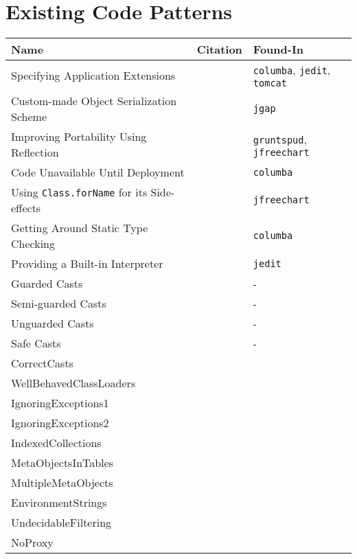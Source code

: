 \documentclass{usiinfdocprop}
\begin{document}
\chapter{Existing Code Patterns \label{orgf594f15}}
\label{sec:org352e005}
\begin{center}
\begin{tabular}{lll}
Name & Citation & Found-In\\
\hline
Specifying Application Extensions & \cite{livshits_improving_2006} & \texttt{columba}, \texttt{jedit}, \texttt{tomcat}\\
Custom-made Object Serialization Scheme & \cite{livshits_improving_2006} & \texttt{jgap}\\
Improving Portability Using Reflection & \cite{livshits_improving_2006} & \texttt{gruntspud}, \texttt{jfreechart}\\
Code Unavailable Until Deployment & \cite{livshits_improving_2006} & \texttt{columba}\\
Using \texttt{Class.forName} for its Side-effects & \cite{livshits_improving_2006} & \texttt{jfreechart}\\
Getting Around Static Type Checking & \cite{livshits_improving_2006} & \texttt{columba}\\
Providing a Built-in Interpreter & \cite{livshits_improving_2006} & \texttt{jedit}\\
Guarded Casts & \cite{winther_guarded_2011} & -\\
Semi-guarded Casts & \cite{winther_guarded_2011} & -\\
Unguarded Casts & \cite{winther_guarded_2011} & -\\
Safe Casts & \cite{winther_guarded_2011} & -\\
CorrectCasts & \cite{landman_challenges_2017} & \\
WellBehavedClassLoaders & \cite{landman_challenges_2017} & \\
IgnoringExceptions1 & \cite{landman_challenges_2017} & \\
IgnoringExceptions2 & \cite{landman_challenges_2017} & \\
IndexedCollections & \cite{landman_challenges_2017} & \\
MetaObjectsInTables & \cite{landman_challenges_2017} & \\
MultipleMetaObjects & \cite{landman_challenges_2017} & \\
EnvironmentStrings & \cite{landman_challenges_2017} & \\
UndecidableFiltering & \cite{landman_challenges_2017} & \\
NoProxy & \cite{landman_challenges_2017} & \\
\end{tabular}
\end{center}
\end{document}
